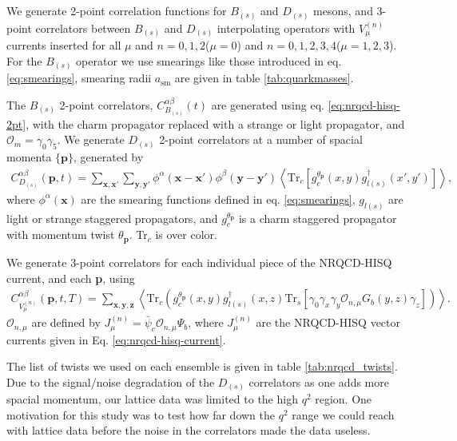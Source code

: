 We generate 2-point correlation functions for $B_{(s)}$ and $D_{(s)}$ mesons, and 3-point correlators between $B_{(s)}$ and $D_{(s)}$ interpolating operators with $V^{(n)}_{\mu}$ currents inserted for all $\mu$ and $n=0,1,2$($\mu=0$) and $n=0,1,2,3,4$($\mu=1,2,3$). For the $B_{(s)}$ operator we use smearings like those introduced in eq. \eqref{eq:smearings}, smearing radii $a_{\text{sm}}$ are given in table \ref{tab:quarkmasses}.

The $B_{(s)}$ 2-point correlators, $C_{B_{(s)}}^{\alpha\beta}(t)$ are generated using eq. \eqref{eq:nrqcd-hisq-2pt}, with the charm propagator replaced with a strange or light propagator, and $\mathcal{O}_{m} = \gamma_0\gamma_5$. We generate $D_{(s)}$ 2-point correlators at a number of spacial momenta $\{{\textbf{p}}\}$, generated by
\begin{align}
  C_{D_{(s)}}^{\alpha\beta}({\textbf{p}},t) = \sum_{{\textbf{x}},{\textbf{x}}'}\sum_{{\textbf{y}},{\textbf{y}}'} \phi^{\alpha}({\textbf{x}}-{\textbf{x}}')\phi^{\beta}({\textbf{y}}-{\textbf{y}}') \left\langle \text{Tr}_c[g_c^{\theta_{\textbf{p}}}(x,y) g^{\dagger}_{l(s)}(x',y') ]\right\rangle,
\end{align}
where $\phi^{\alpha}({\textbf{x}})$ are the smearing functions defined in eq. \eqref{eq:smearings}, $g_{l(s)}$ are light or strange staggered propagators, and $g_c^{\theta_{\textbf{p}}}$ is a charm staggered propagator with momentum twist $\theta_{\textbf{p}}$. Tr$_c$ is over color.

We generate 3-point correlators for each individual piece of the NRQCD-HISQ current, and each {\textbf{p}}, using
\begin{align}
  C_{V_{\mu}^{(n)}}^{\alpha\beta} ({\textbf{p}},t,T) = \sum_{\textbf{x},\textbf{y},\textbf{z}} \left\langle \text{Tr}_c\left( g_c^{\theta_{\textbf{p}}}(x,y) g_{l(s)}^{\dagger}(x,z) \text{Tr}_s\left[ \gamma_0 \gamma_x\gamma_y \mathcal{O}_{n,\mu}G_b(y,z) \gamma_z \right] \right) \right\rangle.
\end{align}
$\mathcal{O}_{n,\mu}$ are defined by $J_{\mu}^{(n)} = \bar{\psi}_c \mathcal{O}_{n,\mu} \Psi_b$, where $J_{\mu}^{(n)}$ are the NRQCD-HISQ vector currents given in Eq. \eqref{eq:nrqcd-hisq-current}.

The list of twists we used on each ensemble is given in table \ref{tab:nrqcd_twists}. Due to the signal/noise degradation of the $D_{(s)}$ correlators as one adds more spacial momentum, our lattice data was limited to the high $q^2$ region. One motivation for this study was to test how far down the $q^2$ range we could reach with lattice data before the noise in the correlators made the data useless.

